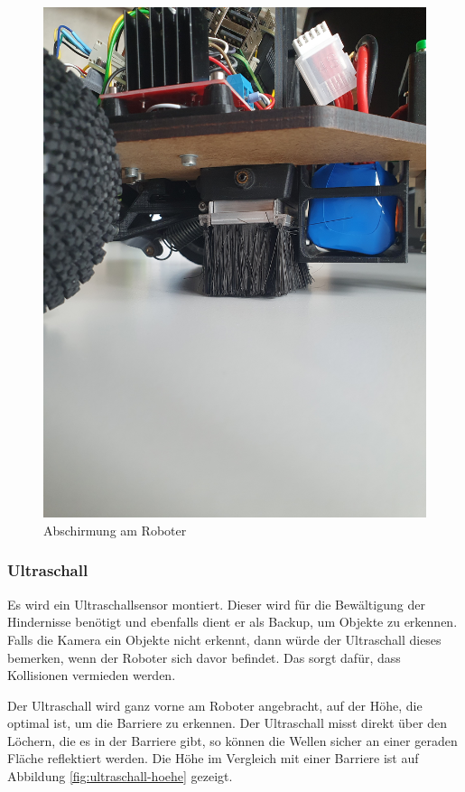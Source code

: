 \begin{figure}[H]
\begin{minipage}[b]{0.45\textwidth}
  \includegraphics[width=\textwidth, angle=90]{assets/MT/liniensensor-beseli.jpg}
  \caption{Abschirmung am Roboter}
  \label{fig:abschirmung-robi}
\end{minipage}
\end{figure}


\subsubsection{Ultraschall}

Es wird ein Ultraschallsensor montiert. Dieser wird für die Bewältigung der Hindernisse benötigt und ebenfalls dient er als Backup, um Objekte zu erkennen. Falls die Kamera ein Objekte nicht erkennt, dann würde der Ultraschall dieses bemerken, wenn der Roboter sich davor befindet. Das sorgt dafür, dass Kollisionen vermieden werden.

Der Ultraschall wird ganz vorne am Roboter angebracht, auf der Höhe, die optimal ist, um die Barriere zu erkennen. Der Ultraschall misst direkt über den Löchern, die es in der Barriere gibt, so können die Wellen sicher an einer geraden Fläche reflektiert werden. Die Höhe im Vergleich mit einer Barriere ist auf Abbildung \ref{fig:ultraschall-hoehe} gezeigt.

